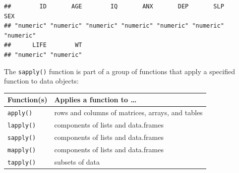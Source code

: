 \documentclass[]{book}
\theoremstyle{definition}
\theoremstyle{definition}
\theoremstyle{definition}
\theoremstyle{remark}
\begin{document}
\begin{verbatim}
##        ID       AGE        IQ       ANX       DEP       SLP       SEX 
## "numeric" "numeric" "numeric" "numeric" "numeric" "numeric" "numeric" 
##      LIFE        WT 
## "numeric" "numeric"
\end{verbatim}

The \texttt{sapply()} function is part of a group of functions that
apply a specified function to data objects:

\begin{longtable}[]{@{}ll@{}}
\toprule
\begin{minipage}[b]{0.27\columnwidth}\raggedright
\textbf{Function(s)}\strut
\end{minipage} & \begin{minipage}[b]{0.67\columnwidth}\raggedright
\textbf{Applies a function to \ldots{}}\strut
\end{minipage}\tabularnewline
\midrule
\endhead
\begin{minipage}[t]{0.27\columnwidth}\raggedright
\texttt{apply()}\strut
\end{minipage} & \begin{minipage}[t]{0.67\columnwidth}\raggedright
rows and columns of matrices, arrays, and tables\strut
\end{minipage}\tabularnewline
\begin{minipage}[t]{0.27\columnwidth}\raggedright
\texttt{lapply()}\strut
\end{minipage} & \begin{minipage}[t]{0.67\columnwidth}\raggedright
components of lists and data.frames\strut
\end{minipage}\tabularnewline
\begin{minipage}[t]{0.27\columnwidth}\raggedright
\texttt{sapply()}\strut
\end{minipage} & \begin{minipage}[t]{0.67\columnwidth}\raggedright
components of lists and data.frames\strut
\end{minipage}\tabularnewline
\begin{minipage}[t]{0.27\columnwidth}\raggedright
\texttt{mapply()}\strut
\end{minipage} & \begin{minipage}[t]{0.67\columnwidth}\raggedright
components of lists and data.frames\strut
\end{minipage}\tabularnewline
\begin{minipage}[t]{0.27\columnwidth}\raggedright
\texttt{tapply()}\strut
\end{minipage} & \begin{minipage}[t]{0.67\columnwidth}\raggedright
subsets of data\strut
\end{minipage}\tabularnewline
\bottomrule
\end{longtable}
\end{document}
